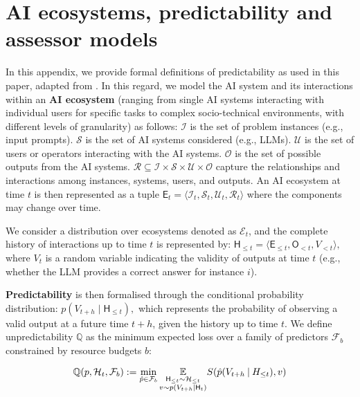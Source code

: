 \documentclass[11pt]{article}
\begin{document}


\clearpage
\appendix


\section{AI ecosystems, predictability and assessor models}
\label{app:predictability_def}

In this appendix, we provide formal definitions of predictability as used in this paper, adapted from \citet{zhou2024predictableartificialintelligence}. In this regard, we model the AI system and its interactions within an \textbf{AI ecosystem} (ranging from single AI systems interacting with individual users for specific tasks to complex socio-technical environments, with different levels of granularity) as follows: $\mathcal{I}$ is the set of problem instances (e.g., input prompts). $\mathcal{S}$ is the set of AI systems considered (e.g., LLMs). $\mathcal{U}$ is the set of users or operators interacting with the AI systems. $\mathcal{O}$ is the set of possible outputs from the AI systems. $\mathcal{R} \subseteq \mathcal{I} \times \mathcal{S} \times \mathcal{U} \times \mathcal{O}$ capture the relationships and interactions among instances, systems, users, and outputs. An AI ecosystem at time $t$ is then represented as a tuple 
$
\mathsf{E}_t = \langle \mathcal{I}_t, \mathcal{S}_t, \mathcal{U}_t, \mathcal{R}_t \rangle
$
where the components may change over time.

We consider a distribution over ecosystems denoted as $\mathcal{E}_{t}$, and the complete history of interactions up to time $t$ is represented by:
$
\mathsf{H}_{\leq t} = \langle \mathsf{E}_{\leq t}, \mathsf{O}_{< t}, V_{< t} \rangle,
$
where $V_t$ is a random variable indicating the validity of outputs at time $t$ (e.g., whether the LLM provides a correct answer for instance $i$).

\textbf{Predictability} is then formalised through the conditional probability distribution:
$
p(V_{t+h} \mid \mathsf{H}_{\leq t}),
$
which represents the probability of observing a valid output at a future time $t+h$, given the history up to time $t$. We define unpredictability $\mathbb{Q}$ as the minimum expected loss over a family of predictors $\mathcal{F}_b$  constrained by resource budgets $b$:


\begin{equation}\label{eq:ecosystemunpred}
\mathbb{Q}(p,  {\cal H}_t,{\cal F}_b) := 
\min_{\hat{p} \in {\cal F}_b}
\underset{\substack{{\sf H}_{\leq t} \sim {\cal H}_{\leq t} \\ v \sim p(V_{t+h}|{\sf H}_t)}}{\mathbb{E}}  S (\hat{p}(V_{t+h}\:|\:H_{\leq t}), v) 
\end{equation}
\end{document}
